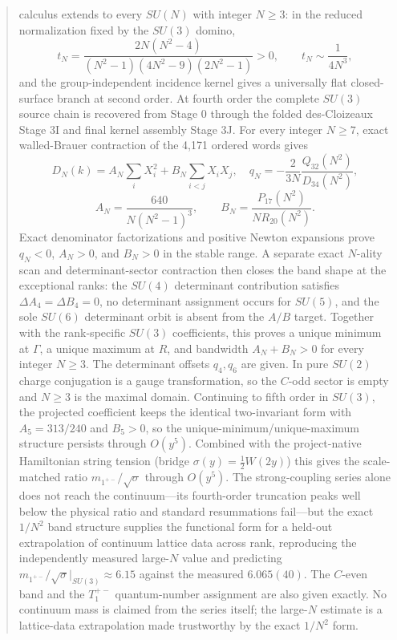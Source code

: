 \documentclass[11pt]{article}
\begin{document}
\begin{abstract}
calculus extends to every $SU(N)$ with integer $N\geq3$: in the reduced
normalization fixed by the $SU(3)$ domino,
\[
t_N=\frac{2N(N^2-4)}{(N^2-1)(4N^2-9)(2N^2-1)}>0,
\qquad t_N\sim\frac{1}{4N^3},
\]
and the group-independent incidence kernel gives a universally flat
closed-surface branch at second order. At fourth order the complete $SU(3)$ source chain is recovered from
Stage 0 through the folded des-Cloizeaux Stage 3I and final kernel assembly
Stage 3J. For every integer $N\geq7$, exact walled-Brauer contraction of the
4,171 ordered words gives
\[
D_N(k)=A_N\sum_iX_i^2+B_N\sum_{i<j}X_iX_j,
\quad
q_N=-\frac{2}{3N}\frac{Q_{32}(N^2)}{D_{34}(N^2)},
\]
\[
A_N=\frac{640}{N(N^2-1)^3},
\qquad
B_N=\frac{P_{17}(N^2)}{N R_{20}(N^2)}.
\]
Exact denominator factorizations and positive Newton expansions prove
$q_N<0$, $A_N>0$, and $B_N>0$ in the stable range. A separate exact
$N$-ality scan and determinant-sector contraction then closes the band shape
at the exceptional ranks: the $SU(4)$ determinant contribution satisfies
$\Delta A_4=\Delta B_4=0$, no determinant assignment occurs for $SU(5)$,
and the sole $SU(6)$ determinant orbit is absent from the $A/B$ target.
Together with the rank-specific $SU(3)$ coefficients, this proves a unique
minimum at $\Gamma$, a unique maximum at $R$, and bandwidth $A_N+B_N>0$
for every integer $N\geq3$. The determinant offsets $q_4,q_6$ are given. In pure $SU(2)$ charge conjugation is a
gauge transformation, so the $C$-odd sector is empty and $N\geq3$ is the maximal
domain. Continuing to fifth order in $SU(3)$, the projected coefficient keeps the
identical two-invariant form with $A_5=313/240$ and $B_5>0$, so the
unique-minimum/unique-maximum structure persists through $O(y^5)$. Combined with the
project-native Hamiltonian string tension (bridge $\sigma(y)=\tfrac12W(2y)$) this
gives the scale-matched ratio $m_{1^{+-}}/\sqrt\sigma$ through $O(y^5)$. The
strong-coupling series alone does not reach the continuum---its fourth-order
truncation peaks well below the physical ratio and standard resummations fail---but
the exact $1/N^2$ band structure supplies the functional form for a held-out
extrapolation of continuum lattice data across rank, reproducing the independently
measured large-$N$ value and predicting $m_{1^{+-}}/\sqrt\sigma|_{SU(3)}\approx6.15$
against the measured $6.065(40)$. The $C$-even band and the $T_1^{+-}$
quantum-number assignment are also given exactly. No continuum mass is claimed from
the series itself; the large-$N$ estimate is a lattice-data extrapolation made
trustworthy by the exact $1/N^2$ form.
\end{abstract}
\end{document}
